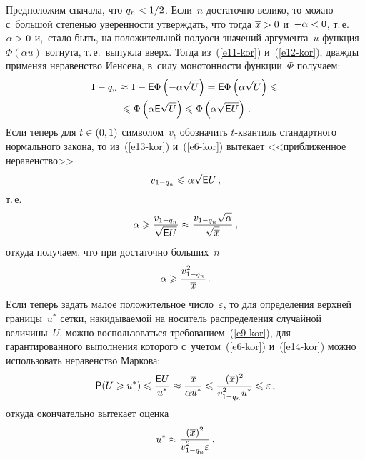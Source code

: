 \begin{multicols}{2}
\noindent
Предположим сначала, что $q_n\hm<1/2$. Если~$n$ достаточно велико,
то можно с~большой степенью
 уверенности утверж\-дать, что тогда
$\overline x\hm>0$ и~$-\alpha\hm<0$, т.\,е.
 $\alpha\hm>0$ и,~стало быть, на
положительной полуоси значений аргумента~$u$ функция $\Phi(\alpha u)$
вогнута, т.\,е.\ выпукла вверх. Тогда из~(\ref{e11-kor}) и~(\ref{e12-kor}), дважды
применяя неравенство Иенсена, в~силу монотонности функции~$\Phi$
получаем:
\begin{multline}
1-q_n\approx 1-{\sf E}\Phi\left(-\alpha\sqrt{U}\right)=
          {\sf E}\Phi\left(\alpha\sqrt{U}\right)\leqslant{}\\
          {}\leqslant\Phi
          \left(\alpha{\sf E}\sqrt{U}\right)\leqslant
          \Phi\left(\alpha\sqrt{{\sf E}U}\right)\,.\label{e13-kor}
\end{multline}
Если теперь для $t\hm\in(0,1)$ символом~$v_t$ обозначить $t$-кван\-тиль
стандартного нормального закона, то из~(\ref{e13-kor}) и~(\ref{e6-kor}) вытекает
<<приближенное неравенство>>
$$
v_{1-q_n}\hm\leqslant \alpha\sqrt{{\sf E}U}\,,
$$
т.\,е.
$$
\alpha\geqslant\displaystyle\frac{\displaystyle v_{1-q_n}\mathstrut}{\displaystyle \sqrt{{\sf E}U}\mathstrut}\approx
\displaystyle\frac{\displaystyle v_{1-q_n}\sqrt{\alpha}\mathstrut}{\displaystyle \sqrt{\overline x}\mathstrut}\,,
$$
откуда получаем, что при достаточно больших~$n$
\begin{equation}
\alpha\geqslant\displaystyle\frac{\displaystyle v_{1-q_n}^2\mathstrut}{\displaystyle \overline x\mathstrut}\,.\label{e14-kor}
\end{equation}
Если теперь задать малое положительное число~$\varepsilon$, то
для определения верхней границы~$u^*$ сетки, накидываемой на
носитель распределения случайной величины~$U$, можно воспользоваться
требованием~(\ref{e9-kor}), для гарантированного выполнения которого
с~учетом~(\ref{e6-kor}) и~(\ref{e14-kor}) можно использовать неравенство Маркова:
$$
{\sf P}(U\geqslant u^*)\leqslant \displaystyle\frac{\displaystyle {\sf E}U\mathstrut}{\displaystyle u^*\mathstrut}\approx\displaystyle\frac{\displaystyle \overline
x\mathstrut}{\displaystyle \alpha u^*\mathstrut}\leqslant \displaystyle\frac{\displaystyle (\overline x)^2\mathstrut}{\displaystyle v_{1-q_n}^2 u^*\mathstrut}\leqslant
\varepsilon\,,
$$
откуда окончательно вытекает оценка
\begin{equation}
u^*\approx\displaystyle\frac{\displaystyle (\overline x)^2\mathstrut}{\displaystyle v_{1-q_n}^2 \varepsilon\mathstrut}\,.\label{e15-kor}
\end{equation}

\begin{figure*}[b] %
\vspace*{18pt}
 \begin{center}
 \mbox{%
 \epsfxsize=162.433mm
 }
 \end{center}
 \vspace*{-9pt}
\end{figure*}




\end{multicols}
